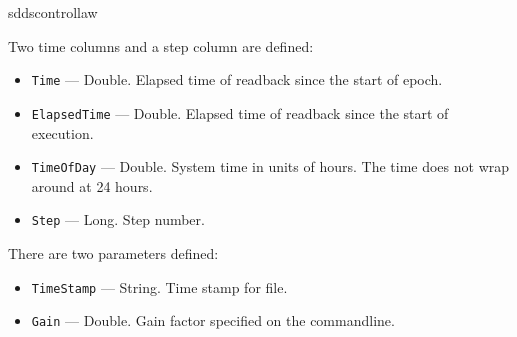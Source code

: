 \begin{sddsprog}{sddscontrollaw}
\begin{itemize}
Two time columns and a step column are defined: 
\begin{itemize}
        \item {\tt Time} --- Double. Elapsed time of readback since the start of epoch.
        \item {\tt ElapsedTime} --- Double. Elapsed time of readback since the start of execution.
        \item {\tt TimeOfDay} --- Double. System time in units of hours. The time does not wrap around at 24 hours.
        \item {\tt Step} --- Long. Step number.
\end{itemize}

There are two parameters defined:
\begin{itemize}
        \item {\tt TimeStamp} --- String. Time stamp for file.
        \item {\tt Gain} --- Double. Gain factor specified on the commandline.
\end{itemize}
\end{itemize}


\end{sddsprog}
